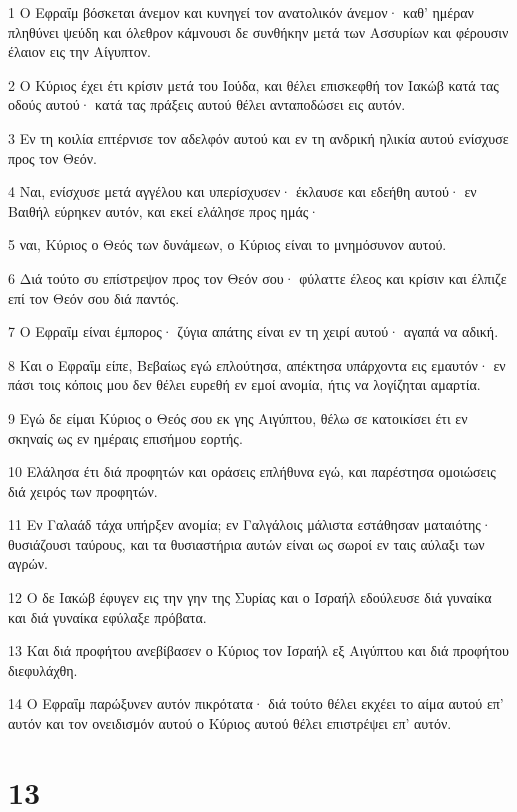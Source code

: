 \par 1 Ο Εφραΐμ βόσκεται άνεμον και κυνηγεί τον ανατολικόν άνεμον· καθ' ημέραν πληθύνει ψεύδη και όλεθρον κάμνουσι δε συνθήκην μετά των Ασσυρίων και φέρουσιν έλαιον εις την Αίγυπτον.
\par 2 Ο Κύριος έχει έτι κρίσιν μετά του Ιούδα, και θέλει επισκεφθή τον Ιακώβ κατά τας οδούς αυτού· κατά τας πράξεις αυτού θέλει ανταποδώσει εις αυτόν.
\par 3 Εν τη κοιλία επτέρνισε τον αδελφόν αυτού και εν τη ανδρική ηλικία αυτού ενίσχυσε προς τον Θεόν.
\par 4 Ναι, ενίσχυσε μετά αγγέλου και υπερίσχυσεν· έκλαυσε και εδεήθη αυτού· εν Βαιθήλ εύρηκεν αυτόν, και εκεί ελάλησε προς ημάς·
\par 5 ναι, Κύριος ο Θεός των δυνάμεων, ο Κύριος είναι το μνημόσυνον αυτού.
\par 6 Διά τούτο συ επίστρεψον προς τον Θεόν σου· φύλαττε έλεος και κρίσιν και έλπιζε επί τον Θεόν σου διά παντός.
\par 7 Ο Εφραΐμ είναι έμπορος· ζύγια απάτης είναι εν τη χειρί αυτού· αγαπά να αδική.
\par 8 Και ο Εφραΐμ είπε, Βεβαίως εγώ επλούτησα, απέκτησα υπάρχοντα εις εμαυτόν· εν πάσι τοις κόποις μου δεν θέλει ευρεθή εν εμοί ανομία, ήτις να λογίζηται αμαρτία.
\par 9 Εγώ δε είμαι Κύριος ο Θεός σου εκ γης Αιγύπτου, θέλω σε κατοικίσει έτι εν σκηναίς ως εν ημέραις επισήμου εορτής.
\par 10 Ελάλησα έτι διά προφητών και οράσεις επλήθυνα εγώ, και παρέστησα ομοιώσεις διά χειρός των προφητών.
\par 11 Εν Γαλαάδ τάχα υπήρξεν ανομία; εν Γαλγάλοις μάλιστα εστάθησαν ματαιότης· θυσιάζουσι ταύρους, και τα θυσιαστήρια αυτών είναι ως σωροί εν ταις αύλαξι των αγρών.
\par 12 Ο δε Ιακώβ έφυγεν εις την γην της Συρίας και ο Ισραήλ εδούλευσε διά γυναίκα και διά γυναίκα εφύλαξε πρόβατα.
\par 13 Και διά προφήτου ανεβίβασεν ο Κύριος τον Ισραήλ εξ Αιγύπτου και διά προφήτου διεφυλάχθη.
\par 14 Ο Εφραΐμ παρώξυνεν αυτόν πικρότατα· διά τούτο θέλει εκχέει το αίμα αυτού επ' αυτόν και τον ονειδισμόν αυτού ο Κύριος αυτού θέλει επιστρέψει επ' αυτόν.

\chapter{13}

